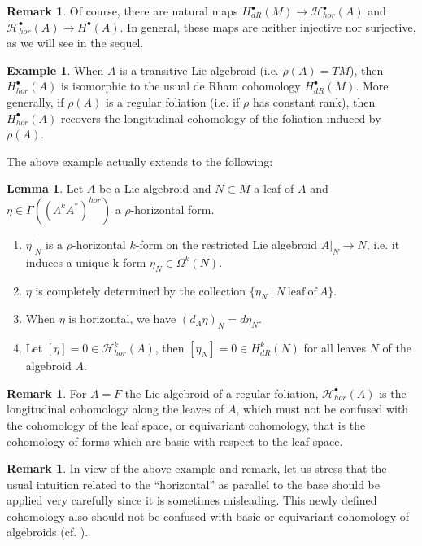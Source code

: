 \documentclass[a4paper,12pt]{amsart}
\theoremstyle{definition}
\newtheorem{Lemma}[Definition]{Lemma}
\newtheorem{Remark}[Definition]{Remark}
\newtheorem{Example}[Definition]{Example}
\newcommand{\leaf}[0]{{N}}
\begin{document}
\begin{Remark} Of course, there are natural maps $H_{dR}^\bullet(M)\to \mathcal H^\bullet_{{hor}}(A) $ and $\mathcal H^\bullet_{{hor}}(A)\to H^\bullet(A)$. In general, these maps are neither injective nor surjective, as we will see in the sequel.
\end{Remark}

\begin{Example}
When $A$ is a transitive Lie algebroid (i.e. $\rho(A)=TM$), then $H^\bullet_{{hor}}(A)$ is isomorphic to the usual de Rham cohomology $H_{dR}^\bullet(M)$. More generally, if $\rho(A)$ is a regular foliation (i.e. if $\rho$ has constant rank), then $H^\bullet_{{hor}}(A)$ recovers the longitudinal cohomology of the foliation induced by $\rho(A)$.
\end{Example}
The above example actually extends to the following:


\begin{Lemma}\label{lem:oidpot}
Let $A$ be a Lie algebroid and $\leaf\subset M$ a leaf of $A$ and $\eta\in \Gamma((\Lambda^kA^*)^{hor})$ a $\rho$-horizontal form. 
\begin{enumerate}
    \item $\eta|_\leaf$ is a $\rho$-horizontal $k$-form on the restricted Lie algebroid $A|_\leaf\to \leaf$, i.e. it induces a unique k-form $\eta_\leaf\in \Omega^k(\leaf)$. 
    \item $\eta$ is completely determined by the collection $\{\eta_\leaf ~|~\leaf\mathrm{~leaf~of~}A\}$.
    \item When $\eta$ is  {horizontal}, we have $(d_A\eta)_\leaf=d\eta_\leaf$.
    \item Let $[\eta]=0\in \mathcal H^k_{{hor}}(A)$, then $[\eta_\leaf]=0\in H^k_{dR}(\leaf)$ for all leaves $\leaf$ of the algebroid $A$.
\end{enumerate}
\end{Lemma}


\begin{Remark}
For $A=F$ the Lie algebroid of a regular foliation,
$\mathcal H^\bullet_{{hor}}(A)$ is 
the longitudinal cohomology along the leaves of $A$, which must not be confused with the cohomology of the leaf space, or equivariant cohomology, that is the cohomology of forms which are basic with respect to the leaf space.
\end{Remark}

\begin{Remark}
In view of the above example and remark, let us stress 
that the usual intuition related to the ``{horizontal}'' as  {parallel to} the base should be applied very carefully since it is sometimes misleading.  {This newly defined cohomology also should not be confused with basic or equivariant cohomology of algebroids (cf. \cite{ginzburg, zucchini}).}
\end{Remark}
\end{document}
